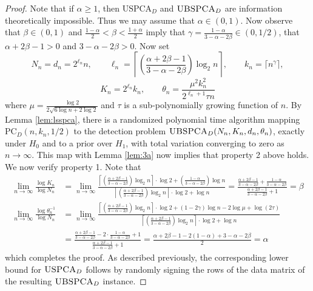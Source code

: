 \begin{proof}
Note that if $\alpha \ge 1$, then $\text{USPCA}_D$ and $\textsc{UBSPCA}_D$ are information theoretically impossible. Thus we may assume that $\alpha \in (0, 1)$. Now observe that $\beta \in (0, 1)$ and $\frac{1 - \alpha}{2} < \beta < \frac{1 + \alpha}{2}$ imply that $\gamma = \frac{1 - \alpha}{3 - \alpha - 2\beta} \in (0, 1/2)$, that $\alpha + 2\beta - 1 > 0$ and $3 - \alpha - 2\beta > 0$. Now set
$$N_n = d_n = 2^{\ell_n} n, \quad \quad \ell_n = \left\lceil \left( \frac{\alpha + 2\beta - 1}{3 - \alpha - 2\beta} \right) \log_2 n \right\rceil, \quad \quad k_n = \lceil n^{\gamma} \rceil,$$
$$K_n = 2^{\ell_n} k_n, \quad \quad \theta_n = \frac{\mu^2 k_n^2}{2^{\ell_n + 1} \tau n}$$
where $\mu =  \frac{\log 2}{2 \sqrt{6 \log n + 2\log 2}}$ and $\tau$ is a sub-polynomially growing function of $n$. 
By Lemma \ref{lem:lsspca}, there is a randomized polynomial time algorithm mapping $\text{PC}_D(n, k_n, 1/2)$ to the detection problem $\textsc{UBSPCA}_D(N_n, K_n, d_n, \theta_n)$, exactly under $H_0$ and to a prior over $H_1$, with total variation converging to zero as $n \to \infty$. This map with Lemma \ref{lem:3a} now implies that property 2 above holds. We now verify property 1. Note that
\begin{align*}
\lim_{n \to \infty} \frac{\log K_n}{\log N_n} &= \lim_{n \to \infty} \frac{\left\lceil \left( \frac{\alpha + 2\beta - 1}{3 - \alpha - 2\beta} \right) \log_2 n \right\rceil \cdot \log 2 + \left( \frac{1 - \alpha}{3 - \alpha - 2\beta} \right) \log n}{\left\lceil \left( \frac{\alpha + 2\beta - 1}{3 - \alpha - 2\beta} \right) \log_2 n \right\rceil \cdot \log 2 + \log n} = \frac{\frac{\alpha + 2\beta - 1}{3 - \alpha - 2\beta} + \frac{1 - \alpha}{3 - \alpha - 2\beta}}{\frac{\alpha + 2\beta - 1}{3 - \alpha - 2\beta} + 1} = \beta \\
\lim_{n \to \infty} \frac{\log \theta_n^{-1}}{\log N_n} &= \lim_{n \to \infty} \frac{\left\lceil \left( \frac{\alpha + 2\beta - 1}{3 - \alpha - 2\beta} \right) \log_2 n \right\rceil \cdot \log 2 + (1 - 2\gamma) \log n - 2 \log \mu + \log(2\tau)}{\left\lceil \left( \frac{\alpha + 2\beta - 1}{3 - \alpha - 2\beta} \right) \log_2 n \right\rceil \cdot \log 2 + \log n} \\
&= \frac{\frac{\alpha + 2\beta - 1}{3 - \alpha - 2\beta} -2 \cdot \frac{1 - \alpha}{3 - \alpha - 2\beta} + 1}{\frac{\alpha + 2\beta - 1}{3 - \alpha - 2\beta} + 1} = \frac{\alpha + 2\beta - 1 - 2(1 - \alpha) + 3 - \alpha - 2\beta}{2}= \alpha
\end{align*}
which completes the proof. As described previously, the corresponding lower bound for $\textsc{USPCA}_D$ follows by randomly signing the rows of the data matrix of the resulting $\textsc{UBSPCA}_D$ instance.
\end{proof}

